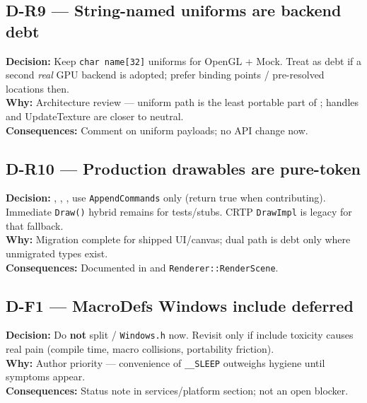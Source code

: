 \subsection*{D-R9 --- String-named uniforms are backend debt}
\begin{decisionbox}[title={D-R9 \quad 2026-07-28}]
\textbf{Decision:} Keep \texttt{char name[32]} uniforms for OpenGL + Mock.
Treat as debt if a second \emph{real} GPU backend is adopted; prefer binding
points / pre-resolved locations then.\\
\textbf{Why:} Architecture review --- uniform path is the least portable part
of ; handles and UpdateTexture are closer to neutral.\\
\textbf{Consequences:} Comment on uniform payloads; no API change now.
\end{decisionbox}

\subsection*{D-R10 --- Production drawables are pure-token}
\begin{decisionbox}[title={D-R10 \quad 2026-07-28}]
\textbf{Decision:} , ,
,  use
\texttt{AppendCommands} only (return true when contributing). Immediate
\texttt{Draw()} hybrid remains for tests/stubs. CRTP \texttt{DrawImpl} is
legacy for that fallback.\\
\textbf{Why:} Migration complete for shipped UI/canvas; dual path is debt only
where unmigrated types exist.\\
\textbf{Consequences:} Documented in  and
\texttt{Renderer::RenderScene}.
\end{decisionbox}

\subsection*{D-F1 --- MacroDefs Windows include deferred}
\begin{decisionbox}[title={D-F1 \quad 2026-07-30}]
\textbf{Decision:} Do \textbf{not} split  /
\texttt{Windows.h} now. Revisit only if include toxicity causes real pain
(compile time, macro collisions, portability friction).\\
\textbf{Why:} Author priority --- convenience of \texttt{\_\_SLEEP} outweighs
hygiene until symptoms appear.\\
\textbf{Consequences:} Status note in services/platform section; not an open
blocker.
\end{decisionbox}

